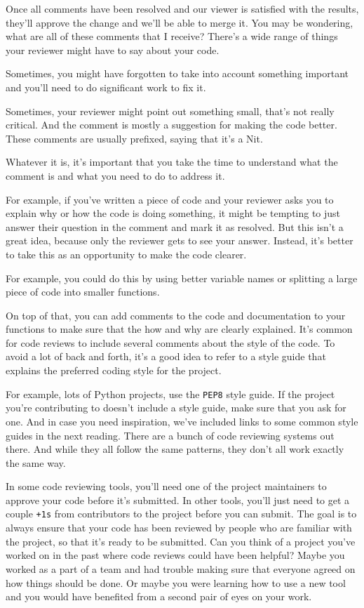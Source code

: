 	Once all comments have been resolved and our viewer is satisfied with the results, they'll approve the change and we'll be able to merge it. You may be wondering, what are all of these comments that I receive? There's a wide range of things your reviewer might have to say about your code. 
	
	Sometimes, you might have forgotten to take into account something important and you'll need to do significant work to fix it. 
	
	Sometimes, your reviewer might point out something small, that's not really critical. And the comment is mostly a suggestion for making the code better. 
	These comments are usually prefixed, saying that it's a Nit. 
	
	Whatever it is, it's important that you take the time to understand what the comment is and what you need to do to address it. 
	
	For example, if you've written a piece of code and your reviewer asks you to explain why or how the code is doing something, it might be tempting to just answer their question in the comment and mark it as resolved. But this isn't a great idea, because only the reviewer gets to see your answer. Instead, it's better to take this as an opportunity to make the code clearer. 
	
	For example, you could do this by using better variable names or splitting a large piece of code into smaller functions.
	
	On top of that, you can add comments to the code and documentation to your functions to make sure that the how and why are clearly explained.
	It's common for code reviews to include several comments about the style of the code. To avoid a lot of back and forth, it's a good idea to refer to a style guide that explains the preferred coding style for the project. 
	
	For example, lots of Python projects, use the \texttt{PEP8} style guide. If the project you're contributing to doesn't include a style guide, make sure that you ask for one. And in case you need inspiration, we've included links to some common style guides in the next reading. There are a bunch of code reviewing systems out there. And while they all follow the same patterns, they don't all work exactly the same way. 
	
	In some code reviewing tools, you'll need one of the project maintainers to approve your code before it's submitted. In other tools, you'll just need to get a couple \verb|+1s| from contributors to the project before you can submit. The goal is to always ensure that your code has been reviewed by people who are familiar with the project, so that it's ready to be submitted. Can you think of a project you've worked on in the past where code reviews could have been helpful? Maybe you worked as a part of a team and had trouble making sure that everyone agreed on how things should be done. Or maybe you were learning how to use a new tool and you would have benefited from a second pair of eyes on your work. 
	
